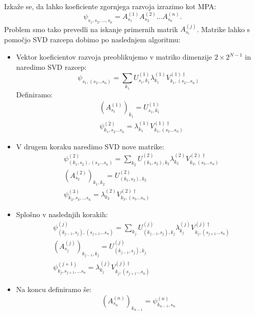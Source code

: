 \documentclass{article}
\begin{document}
Izkaže se, da lahko koeficiente zgornjega razvoja izrazimo kot MPA:
\begin{equation*}
\psi_{s_1 , s_2, \dots , s_n} = A_{s_1}^{(1)} A_{s_2}^{(2)} \dots A_{s_n}^{(n)}.
\end{equation*}
Problem smo tako prevedli na iskanje primernih matrik $A_{s_i}^{(j)}$.
Matrike lahko s pomočjo SVD razcepa dobimo po naslednjem algoritmu:
\begin{itemize}
\item Vektor koeficientov razvoja preoblikujemo v matriko dimenzije $2 \times 2^{N-1}$ in naredimo SVD razcep:
\begin{equation*}
\psi_{s_1, (s_2 \dots s_n)} = \sum_{k_1} U_{s_1, k_1}^{(1)} \lambda_{k_1}^{(1)} V_{k_1, (s_2 \dots s_n)}^{(1) \dagger}
\end{equation*}
Definiramo:
\begin{align*}
&(A_{s_1}^{(1)})_{k_1} = U_{s_1, k_1}^{(1)} \\
&\psi_{k_1, s_2 \dots s_n}^{(2)} = \lambda_{k_1}^{(1)} V_{k_1, (s_2 \dots s_n)}^{(1) \dagger}
\end{align*}

\item V drugem koraku naredimo SVD nove matrike:
\begin{align*}
&\psi_{(k_1, s_2), (s_3 \dots s_n)}^{(2)} = \sum_{k_2} U_{(k_1, s_2),k_2}^{(2)} \lambda_{k_2}^{(2)} V_{k_2, (s_3 \dots s_n)}^{(2) \dagger} \\
&(A_{s_2}^{(2)})_{k_1,k_2} = U_{(k_1,s_2),k_2}^{(2)} \\
&\psi_{k_2, s_3, \dots s_n}^{(3)} = \lambda_{k_2}^{(2)} V_{k_2, (s_3 \dots s_n)}^{(2) \dagger}
\end{align*}

\item Splošno v naslednjih korakih:
\begin{align*}
&\psi_{(k_{j-1}, s_j), (s_{j+1} \dots s_n)}^{(j)} = \sum_{k_j} U_{(k_{j-1}, s_j),k_j}^{(j)} \lambda_{k_j}^{(j)} V_{k_j, (s_{j+1} \dots s_n)}^{(j) \dagger} \\
&(A_{s_j}^{(j)})_{k_{j-1},k_j} = U_{(k_{j-1},s_j),k_j}^{(j)} \\
&\psi_{k_j, s_{j+1}, \dots s_n}^{(j+1)} = \lambda_{k_j}^{(j)} V_{k_j, (s_{j+1} \dots s_n)}^{(j) \dagger}
\end{align*}

\item Na koncu definiramo še:
\begin{equation*}
(A_{s_n}^{(n)})_{k_{n-1}} = \psi_{k_{n-1},s_n}^{(n)}
\end{equation*}
\end{itemize}
\end{document}
